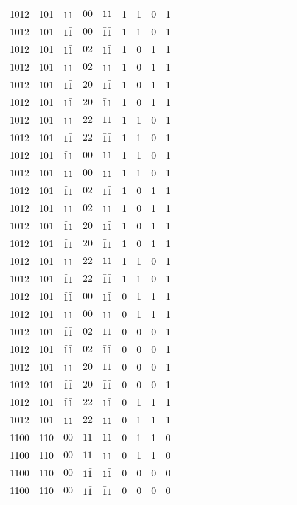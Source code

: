 \begin{longtable*}{c| cccccccccccccccccccc }
1012& 101& $1\bar{1}$& $00$& $11$& 1& 1& 0& 1\\
1012& 101& $1\bar{1}$& $00$& $\bar{1}\bar{1}$& 1& 1& 0& 1\\
1012& 101& $1\bar{1}$& $02$& $1\bar{1}$& 1& 0& 1& 1\\
1012& 101& $1\bar{1}$& $02$& $\bar{1}1$& 1& 0& 1& 1\\
1012& 101& $1\bar{1}$& $20$& $1\bar{1}$& 1& 0& 1& 1\\
1012& 101& $1\bar{1}$& $20$& $\bar{1}1$& 1& 0& 1& 1\\
1012& 101& $1\bar{1}$& $22$& $11$& 1& 1& 0& 1\\
1012& 101& $1\bar{1}$& $22$& $\bar{1}\bar{1}$& 1& 1& 0& 1\\
1012& 101& $\bar{1}1$& $00$& $11$& 1& 1& 0& 1\\
1012& 101& $\bar{1}1$& $00$& $\bar{1}\bar{1}$& 1& 1& 0& 1\\
1012& 101& $\bar{1}1$& $02$& $1\bar{1}$& 1& 0& 1& 1\\
1012& 101& $\bar{1}1$& $02$& $\bar{1}1$& 1& 0& 1& 1\\
1012& 101& $\bar{1}1$& $20$& $1\bar{1}$& 1& 0& 1& 1\\
1012& 101& $\bar{1}1$& $20$& $\bar{1}1$& 1& 0& 1& 1\\
1012& 101& $\bar{1}1$& $22$& $11$& 1& 1& 0& 1\\
1012& 101& $\bar{1}1$& $22$& $\bar{1}\bar{1}$& 1& 1& 0& 1\\
1012& 101& $\bar{1}\bar{1}$& $00$& $1\bar{1}$& 0& 1& 1& 1\\
1012& 101& $\bar{1}\bar{1}$& $00$& $\bar{1}1$& 0& 1& 1& 1\\
1012& 101& $\bar{1}\bar{1}$& $02$& $11$& 0& 0& 0& 1\\
1012& 101& $\bar{1}\bar{1}$& $02$& $\bar{1}\bar{1}$& 0& 0& 0& 1\\
1012& 101& $\bar{1}\bar{1}$& $20$& $11$& 0& 0& 0& 1\\
1012& 101& $\bar{1}\bar{1}$& $20$& $\bar{1}\bar{1}$& 0& 0& 0& 1\\
1012& 101& $\bar{1}\bar{1}$& $22$& $1\bar{1}$& 0& 1& 1& 1\\
1012& 101& $\bar{1}\bar{1}$& $22$& $\bar{1}1$& 0& 1& 1& 1\\
1100& 110& $00$& $11$& $11$& 0& 1& 1& 0\\
1100& 110& $00$& $11$& $\bar{1}\bar{1}$& 0& 1& 1& 0\\
1100& 110& $00$& $1\bar{1}$& $1\bar{1}$& 0& 0& 0& 0\\
1100& 110& $00$& $1\bar{1}$& $\bar{1}1$& 0& 0& 0& 0\\

\end{longtable*}
